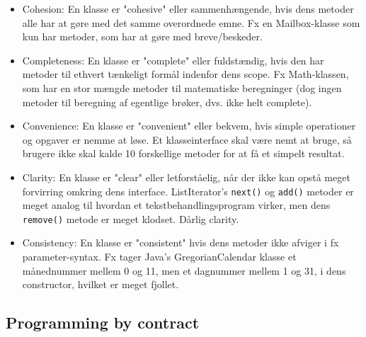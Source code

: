 \begin{itemize}
  \item Cohesion: En klasse er "cohesive" eller sammenhængende, hvis dens metoder alle har at gøre med det samme overordnede emne. Fx en Mailbox-klasse som kun har metoder, som har at gøre med breve/beskeder.
  \item Completeness: En klasse er "complete" eller fuldstændig, hvis den har metoder til ethvert tænkeligt formål indenfor dens scope. Fx Math-klassen, som har en stor mængde metoder til matematiske beregninger (dog ingen metoder til beregning af egentlige brøker, dvs. ikke helt complete).
  \item Convenience: En klasse er "convenient" eller bekvem, hvis simple operationer og opgaver er nemme at løse. Et klasseinterface skal være nemt at bruge, så brugere ikke skal kalde 10 forskellige metoder for at få et simpelt resultat.
  \item Clarity: En klasse er "clear" eller letforståelig, når der ikke kan opstå meget forvirring omkring dens interface. ListIterator's \verb|next()| og \verb|add()| metoder er meget analog til hvordan et tekstbehandlingsprogram virker, men dens \verb|remove()| metode er meget klodset. Dårlig clarity.
  \item Consistency: En klasse er "consistent" hvis dens metoder ikke afviger i fx parameter-syntax. Fx tager Java's GregorianCalendar klasse et månednummer mellem 0 og 11, men et dagnummer mellem 1 og 31, i dens constructor, hvilket er meget fjollet.
\end{itemize}

\subsection{Programming by contract}

